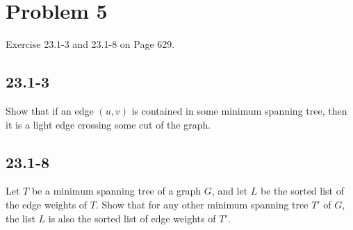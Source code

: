 \documentclass{../../class}
\begin{document}
\newpage
\section*{Problem 5}
\begin{tcolorbox}
    Exercise 23.1-3 and 23.1-8 on Page 629.
\end{tcolorbox}
\subsection*{23.1-3}
Show that if an edge $(u, v)$ is contained in some minimum spanning tree, then it is a light edge crossing some cut of the graph.

\subsection*{23.1-8}
Let $T$ be a minimum spanning tree of a graph $G$, and let $L$ be the sorted list of the edge weights of $T$. Show that for any other minimum spanning tree $T'$ of $G$, the list $L$ is also the sorted list of edge weights of $T'$.
\end{document}
